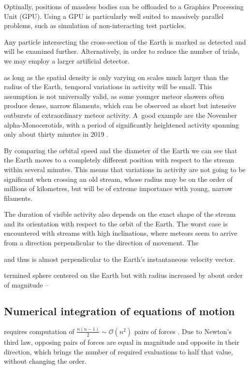     Optinally, positions of massless bodies can be offloaded to a Graphics Processing Unit (GPU).
    Using a GPU is particularly well suited to massively parallel problems, such as simulation of non-interacting test particles.

    Any particle intersecting the cross-section of the Earth is marked as detected and will be examined further.
    Alternatively, in order to reduce the number of trials, we may employ a larger artificial detector.


    as long as the spatial density is only varying on scales much larger than the radius of the Earth,
    temporal variations in activity will be small.
    This assumption is not universally valid, as some younger meteor showers often produce dense, narrow filaments,
    which can be observed as short but intensive outbursts of extraordinary meteor activity.
    A~good example are the November alpha-Monocerotids, with a period of significantly
    heightened activity spanning only about thirty minutes in 2019 \citep{CBET4692}.

    By comparing the orbital speed and the diameter of the Earth we can see that the Earth moves
    to a completely different position with respect to the stream within several minutes.
    This means that variations in activity are not going to be significant when crossing an old stream,
    whose radius may be on the order of millions of kilometres, but will be of extreme importance with young, narrow filaments.

    The duration of visible activity also depends on the exact shape of the stream and its orientation with respect to the orbit of the Earth.
    The worst case is encountered with streams with high inclinations, where meteors seem to arrive from a direction perpendicular
    to the direction of movement. The 

     and thus is almost perpendicular to the Earth's instantaneous velocity vector.



    termined sphere centered on the Earth but with
    radius increased by about  order of magnitude --

    \subsection{Numerical integration of equations of motion} \label{asi}
        requires computation of $\frac{n\left(n - 1\right)}{2} \sim \mathcal{O}(n^2)$ pairs of forces \cite{...}.
        Due to Newton's third law, opposing pairs of forces are equal in magnitude and opposite in their direction,
        which brings the number of required evaluations to half that value, without changing the order.



